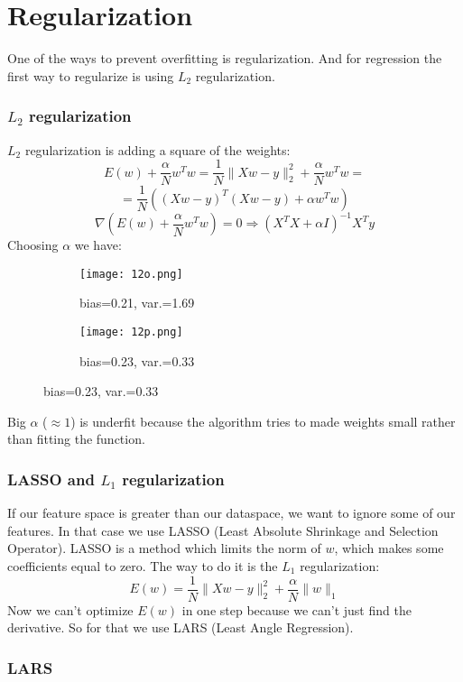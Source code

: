 \section{Regularization}

One of the ways to prevent overfitting is regularization. And for regression the first way to regularize is using $L_2$ regularization.

\subsubsection*{$L_2$ regularization}

$L_2$ regularization is adding a square of the weights:
$$E(w) + \frac{\alpha}{N} w^Tw=\frac{1}{N}\|Xw-y\|_2^2+\frac{\alpha}{N} w^Tw=$$
$$=\frac{1}{N}\left((Xw-y)^T(Xw-y)+\alpha w^Tw\right)$$
$$\nabla \left(E(w)+\frac{\alpha}{N} w^Tw\right)=0\Rightarrow\left(X^TX+\alpha I\right)^{-1}X^Ty$$
Choosing $\alpha$ we have:
\begin{figure}[H]
  \centering
  \begin{subfigure}[c]{0.28\linewidth}
    \texttt{[image: 12o.png]}
    \caption*{bias=0.21, var.=1.69}
  \end{subfigure}
  \hspace{2cm}
  \begin{subfigure}[c]{0.28\linewidth}
    \texttt{[image: 12p.png]}
    \caption*{bias=0.23, var.=0.33}
  \end{subfigure}
  \vspace{-0.4cm}
\end{figure}
Big $\alpha$ ($\approx1$) is underfit because the algorithm tries to made weights small rather than fitting the function.

\subsubsection*{LASSO and $L_1$ regularization}

If our feature space is greater than our dataspace, we want to ignore some of our features. In that case we use LASSO (Least Absolute Shrinkage and Selection Operator). LASSO is a method which limits the norm of $w$, which makes some coefficients equal to zero. The way to do it is the $L_1$ regularization:
$$E(w)=\frac{1}{N}\|Xw-y\|_2^2+\frac{\alpha}{N}\|w\|_1$$
Now we can't optimize $E(w)$ in one step because we can't just find the derivative. So for that we use LARS (Least Angle Regression).

\subsubsection*{LARS}

